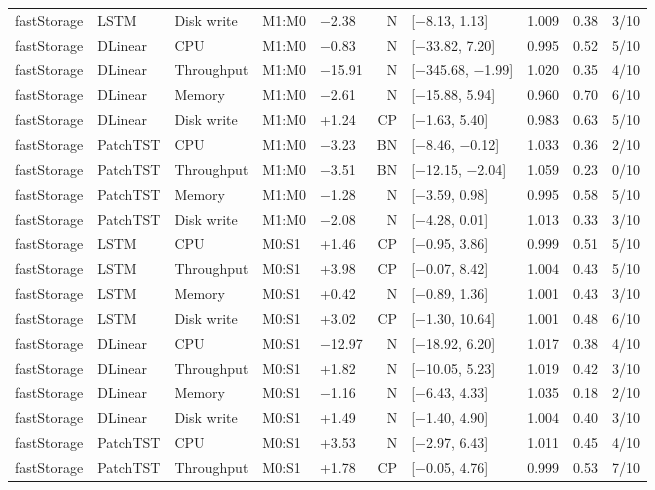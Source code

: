 \begin{longtable}{@{}lllllrlrrr@{}}
fastStorage & LSTM & Disk write & M1:M0 & $-$2.38 & N & [$-$8.13, 1.13] & 1.009 & 0.38 & 3/10 \\
fastStorage & DLinear & CPU & M1:M0 & $-$0.83 & N & [$-$33.82, 7.20] & 0.995 & 0.52 & 5/10 \\
fastStorage & DLinear & Throughput & M1:M0 & $-$15.91 & N & [$-$345.68, $-$1.99] & 1.020 & 0.35 & 4/10 \\
fastStorage & DLinear & Memory & M1:M0 & $-$2.61 & N & [$-$15.88, 5.94] & 0.960 & 0.70 & 6/10 \\
fastStorage & DLinear & Disk write & M1:M0 & +1.24 & CP & [$-$1.63, 5.40] & 0.983 & 0.63 & 5/10 \\
fastStorage & PatchTST & CPU & M1:M0 & $-$3.23 & BN & [$-$8.46, $-$0.12] & 1.033 & 0.36 & 2/10 \\
fastStorage & PatchTST & Throughput & M1:M0 & $-$3.51 & BN & [$-$12.15, $-$2.04] & 1.059 & 0.23 & 0/10 \\
fastStorage & PatchTST & Memory & M1:M0 & $-$1.28 & N & [$-$3.59, 0.98] & 0.995 & 0.58 & 5/10 \\
fastStorage & PatchTST & Disk write & M1:M0 & $-$2.08 & N & [$-$4.28, 0.01] & 1.013 & 0.33 & 3/10 \\
fastStorage & LSTM & CPU & M0:S1 & +1.46 & CP & [$-$0.95, 3.86] & 0.999 & 0.51 & 5/10 \\
fastStorage & LSTM & Throughput & M0:S1 & +3.98 & CP & [$-$0.07, 8.42] & 1.004 & 0.43 & 5/10 \\
fastStorage & LSTM & Memory & M0:S1 & +0.42 & N & [$-$0.89, 1.36] & 1.001 & 0.43 & 3/10 \\
fastStorage & LSTM & Disk write & M0:S1 & +3.02 & CP & [$-$1.30, 10.64] & 1.001 & 0.48 & 6/10 \\
fastStorage & DLinear & CPU & M0:S1 & $-$12.97 & N & [$-$18.92, 6.20] & 1.017 & 0.38 & 4/10 \\
fastStorage & DLinear & Throughput & M0:S1 & +1.82 & N & [$-$10.05, 5.23] & 1.019 & 0.42 & 3/10 \\
fastStorage & DLinear & Memory & M0:S1 & $-$1.16 & N & [$-$6.43, 4.33] & 1.035 & 0.18 & 2/10 \\
fastStorage & DLinear & Disk write & M0:S1 & +1.49 & N & [$-$1.40, 4.90] & 1.004 & 0.40 & 3/10 \\
fastStorage & PatchTST & CPU & M0:S1 & +3.53 & N & [$-$2.97, 6.43] & 1.011 & 0.45 & 4/10 \\
fastStorage & PatchTST & Throughput & M0:S1 & +1.78 & CP & [$-$0.05, 4.76] & 0.999 & 0.53 & 7/10 \\

\end{longtable}

